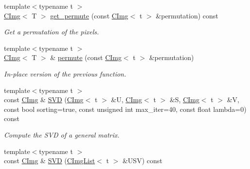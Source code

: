 \begin{DoxyCompactItemize}
\item 
\hypertarget{structcimg__library_1_1_c_img_ac6d037554d52ca0dbe2029041f3f9185}{{\footnotesize template$<$typename t $>$ }\\\hyperlink{structcimg__library_1_1_c_img}{C\-Img}$<$ T $>$ \hyperlink{structcimg__library_1_1_c_img_ac6d037554d52ca0dbe2029041f3f9185}{get\-\_\-permute} (const \hyperlink{structcimg__library_1_1_c_img}{C\-Img}$<$ t $>$ \&permutation) const }\label{structcimg__library_1_1_c_img_ac6d037554d52ca0dbe2029041f3f9185}

\begin{DoxyCompactList}\small\item\em Get a permutation of the pixels. \end{DoxyCompactList}\item 
\hypertarget{structcimg__library_1_1_c_img_a22f1eb1076e53fe63a73ae4a86375008}{{\footnotesize template$<$typename t $>$ }\\\hyperlink{structcimg__library_1_1_c_img}{C\-Img}$<$ T $>$ \& \hyperlink{structcimg__library_1_1_c_img_a22f1eb1076e53fe63a73ae4a86375008}{permute} (const \hyperlink{structcimg__library_1_1_c_img}{C\-Img}$<$ t $>$ \&permutation)}\label{structcimg__library_1_1_c_img_a22f1eb1076e53fe63a73ae4a86375008}

\begin{DoxyCompactList}\small\item\em In-\/place version of the previous function. \end{DoxyCompactList}\item 
\hypertarget{structcimg__library_1_1_c_img_a9c2dfbf251eb406230b0523555a9a024}{{\footnotesize template$<$typename t $>$ }\\const \hyperlink{structcimg__library_1_1_c_img}{C\-Img} \& \hyperlink{structcimg__library_1_1_c_img_a9c2dfbf251eb406230b0523555a9a024}{S\-V\-D} (\hyperlink{structcimg__library_1_1_c_img}{C\-Img}$<$ t $>$ \&U, \hyperlink{structcimg__library_1_1_c_img}{C\-Img}$<$ t $>$ \&S, \hyperlink{structcimg__library_1_1_c_img}{C\-Img}$<$ t $>$ \&V, const bool sorting=true, const unsigned int max\-\_\-iter=40, const float lambda=0) const }\label{structcimg__library_1_1_c_img_a9c2dfbf251eb406230b0523555a9a024}

\begin{DoxyCompactList}\small\item\em Compute the S\-V\-D of a general matrix. \end{DoxyCompactList}\item 
\hypertarget{structcimg__library_1_1_c_img_a990c5f1704580943aab01bf8f24766d7}{{\footnotesize template$<$typename t $>$ }\\const \hyperlink{structcimg__library_1_1_c_img}{C\-Img} \& \hyperlink{structcimg__library_1_1_c_img_a990c5f1704580943aab01bf8f24766d7}{S\-V\-D} (\hyperlink{structcimg__library_1_1_c_img_list}{C\-Img\-List}$<$ t $>$ \&U\-S\-V) const }\label{structcimg__library_1_1_c_img_a990c5f1704580943aab01bf8f24766d7}


\end{DoxyCompactItemize}

